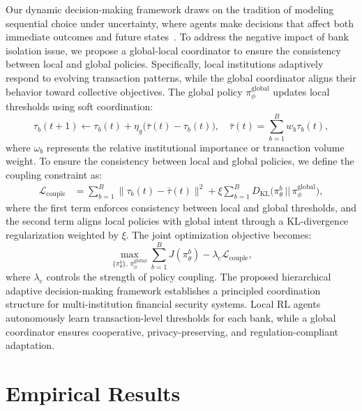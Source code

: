 \documentclass[11pt,english]{article}
\begin{document}
Our dynamic decision-making framework draws on the tradition of modeling sequential choice under uncertainty, where agents make decisions that affect both immediate outcomes and future states~\parencite{mehta2017ni}. To address the negative impact of bank isolation issue, we propose a global-local coordinator to ensure the consistency between local and global policies. Specifically, local institutions adaptively respond to evolving transaction patterns, while the global coordinator aligns their behavior toward collective objectives. The global policy $\pi_\phi^{\text{global}}$ updates local thresholds using soft coordination:
\begin{equation}
    \tau_b(t+1) \leftarrow \tau_b(t) + \eta_g \big(\bar{\tau}(t) - \tau_b(t)\big), \quad 
    \bar{\tau}(t) = \sum_{b=1}^{B} w_b \tau_b(t), 
\end{equation}
where $\omega_b$ represents the relative institutional importance or transaction volume weight. To ensure the consistency between local and global policies, we define the coupling constraint as:
\begin{align}
    \mathcal{L}_{\text{couple}} &= 
    \sum_{b=1}^B \big\| \tau_b(t) - \bar{\tau}(t) \big\|^2
    + \xi \sum_{b=1}^B D_{\mathrm{KL}}\!\big(\pi_\theta^b \,||\, \pi_\phi^{\text{global}}\big), 
\end{align}
where the first term enforces consistency between local and global thresholds, and the second term aligns local policies with global intent through a KL-divergence regularization weighted by $\xi$. 
The joint optimization objective becomes:
\begin{equation}
    \max_{\{\pi_\theta^b\},\, \pi_\phi^{\text{global}}}
    \sum_{b=1}^B J(\pi_\theta^b)
    - \lambda_{\text{c}} \mathcal{L}_{\text{couple}},
\end{equation}
where $\lambda_{\text{c}}$ controls the strength of policy coupling.
The proposed hierarchical adaptive decision-making framework establishes a principled coordination structure for multi-institution financial security systems. Local RL agents autonomously learn transaction-level thresholds for each bank, while a global coordinator ensures cooperative, privacy-preserving, and regulation-compliant adaptation.  





\section{Empirical Results}
\end{document}

